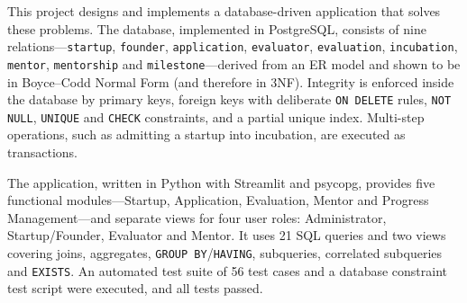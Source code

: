 \documentclass[12pt,a4paper]{report}
\newcommand{\code}[1]{\texttt{#1}}             %
\begin{document}
This project designs and implements a database-driven application that solves these problems.
The database, implemented in PostgreSQL, consists of nine relations---\code{startup},
\code{founder}, \code{application}, \code{evaluator}, \code{evaluation}, \code{incubation},
\code{mentor}, \code{mentorship} and \code{milestone}---derived from an ER model and shown to be
in Boyce--Codd Normal Form (and therefore in 3NF). Integrity is enforced inside the database by
primary keys, foreign keys with deliberate \code{ON DELETE} rules, \code{NOT NULL},
\code{UNIQUE} and \code{CHECK} constraints, and a partial unique index. Multi-step operations,
such as admitting a startup into incubation, are executed as transactions.

The application, written in Python with Streamlit and psycopg, provides five functional
modules---Startup, Application, Evaluation, Mentor and Progress Management---and separate views
for four user roles: Administrator, Startup/Founder, Evaluator and Mentor. It uses 21 SQL queries
and two views covering joins, aggregates, \code{GROUP BY}/\code{HAVING}, subqueries, correlated
subqueries and \code{EXISTS}. An automated test suite of 56 test cases and a database constraint
test script were executed, and all tests passed.

\tableofcontents
\listoffigures
\listoftables
\lstlistoflistings

\clearpage
{}



% 
% 
% 
% 
% 
\end{document}
